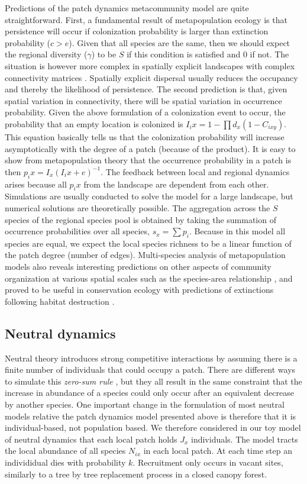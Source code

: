 \documentclass[12pt]{article}
\begin{document}
Predictions of the patch dynamics metacommunity model are quite straightforward.
First, a fundamental result of metapopulation ecology is that persistence will
occur if colonization probability is larger than extinction probability ($c>e$).
Given that all species are the same, then we should expect the regional
diversity ($\gamma$) to be $S$ if this condition is satisfied and $0$ if not. The situation
is however more complex in spatially explicit landscapes with complex
connectivity matrices \parencite{Hanski1998}. Spatially explicit dispersal
usually reduces the occupancy and thereby the likelihood of persistence. The
second prediction is that, given spatial variation in connectivity, there will
be spatial variation in occurrence probability. Given the above formulation of a
colonization event to occur, the probability that an empty location is colonized
is $I_ix=1-\prod d_x(1-C_{ixy})$. This equation basically tells us that the
colonization probability will increase asymptotically with the degree of a patch
(because of the product). It is easy to show from metapopulation theory that the
occurrence probability in a patch is then $p_ix=I_x(I_ix+e)^{-1}$. The feedback
between local and regional dynamics arises because all $p_ix$ from the landscape
are dependent from each other. Simulations are usually conducted to solve the
model for a large landscape, but numerical solutions are theoretically possible.
The aggregation across the $S$ species of the regional species pool is obtained
by taking the summation of occurrence probabilities over all species, $s_x =
\sum{p_i}$. Because in this model all species are equal, we expect the local
species richness to be a linear function of the patch degree (number of edges). Multi-species
analysis of metapopulation models also reveals interesting predictions on other
aspects of community organization at various spatial scales such as the species-area
relationship \parencite{Hanski1997}, and proved to be useful in conservation
ecology with predictions of extinctions following habitat destruction
\parencite{Nee1994,Rybicki2013}.

\subsection*{Neutral dynamics}

Neutral theory introduces strong competitive interactions by assuming there is a
finite number of individuals that could occupy a patch. There are different ways
to simulate this \emph{zero-sum rule} \parencite{Bell2000,Hubbell2001}, but they
all result in the same constraint that the increase in abundance of a species
could only occur after an equivalent decrease by another species. One important
change in the formulation of most neutral models relative the patch dynamics
model presented above is therefore that it is individual-based, not population
based. We therefore considered in our toy model of neutral dynamics that each
local patch holds $J_x$ individuals. The model tracts the local abundance of all
species $N_{ix}$ in each local patch. At each time step an individidual dies
with probability $k$. Recruitment only occurs in vacant sites, similarly to a
tree by tree replacement process in a closed canopy forest.
\end{document}
